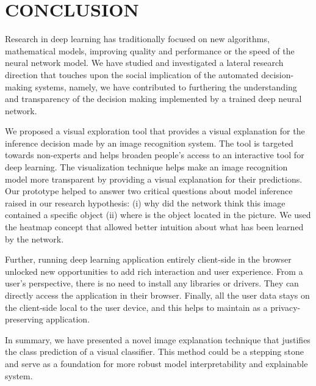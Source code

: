 %
%

\chapter{CONCLUSION}
\thispagestyle{empty}

Research in deep learning has traditionally focused on new algorithms, mathematical models, improving quality and performance or the speed of the neural network model. We have studied and investigated a lateral research direction that touches upon the social implication of the automated decision-making systems, namely, we have contributed to furthering the understanding and transparency of the decision making implemented by a trained deep neural network. 

We proposed a visual exploration tool that provides a visual explanation for the inference decision made by an image recognition system. The tool is targeted towards non-experts and helps broaden people's access to an interactive tool for deep learning. The visualization technique helps make an image recognition model more transparent by providing a visual explanation for their predictions. Our prototype helped to answer two critical questions about model inference raised in our research hypothesis: (i) why did the network think this image contained a specific object (ii) where is the object located in the picture. We used the heatmap concept that allowed better intuition about what has been learned by the network.

Further, running deep learning application entirely client-side in the browser unlocked new opportunities to add rich interaction and user experience. From a user's perspective, there is no need to install any libraries or drivers. They can directly access the application in their browser. Finally, all the user data stays on the client-side local to the user device, and this helps to maintain as a privacy-preserving application.

In summary, we have presented a novel image explanation technique that justifies the class prediction of a visual classifier. This method could be a  stepping stone and serve as a foundation for more robust model interpretability and explainable system.





